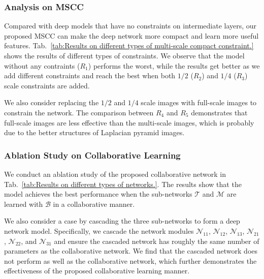 \documentclass[letterpaper]{article} %
\begin{document}
\subsubsection{Analysis on MSCC}
Compared with deep models that have no constraints on intermediate layers, our proposed MSCC can make the deep network more compact and learn more useful features.
Tab.~\ref{tab:Results on different types of multi-scale compact constraint.} shows the results of different types of constraints.
We observe that the model without any contraints ($R_{1}$) performs the worst, while the results get better as we add different constraints and reach the best when both $1/2$ ($R_{2}$) and $1/4$ ($R_{3}$) scale constraints are added.


We also consider replacing the $1/2$ and $1/4$ scale images with full-scale images to constrain the network.
The comparison between $R_{4}$ and $R_{5}$ demonstrates that full-scale images are less effective than the multi-scale images, which is probably due to the better structures of Laplacian pyramid images.
\subsubsection{Ablation Study on Collaborative Learning}
We conduct an ablation study of the proposed collaborative network in Tab.~\ref{tab:Results on different types of networks.}. %
The results show that the model achieves the best performance when the sub-networks $\mathcal{T}$ and $\mathcal{M}$ are learned with $\mathcal{B}$ in a  collaborative manner.

We also consider a case by cascading the three sub-networks to form a deep network model.
Specifically, we cascade the network modules $\mathcal{N}_{11}$, $\mathcal{N}_{12}$, $\mathcal{N}_{13}$, $\mathcal{N}_{21}$, $\mathcal{N}_{22}$, and $\mathcal{N}_{31}$ and ensure the cascaded network has roughly the same number of parameters as the collaborative network. We find that the cascaded network does not perform as well as the collaborative network, which further demonstrates the effectiveness of the proposed collaborative learning manner.
\end{document}
